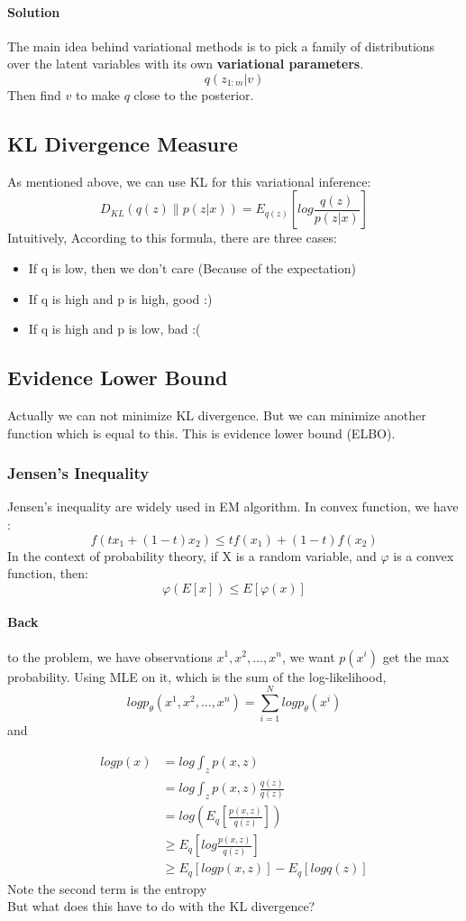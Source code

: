 \documentclass{article}
\begin{document}
\paragraph{Solution} The main idea behind variational methods is to pick a family of distributions over the latent variables with its own \textbf{variational parameters}.
$$q(z_{1:m}|v)$$
Then find $v$ to make $q$ close to the posterior.
\subsection{KL Divergence Measure}
As mentioned above, we can use KL for this variational inference:
$$D_{KL}(q(z) \parallel p(z|x))=E_{q(z)} \left[ log \frac{q(z)}{p(z|x)} \right]$$
Intuitively, According to this formula, there are three cases:
\begin{itemize}
\item If q is low, then we don't care (Because of the expectation)
\item If q is high and p is high, good :)
\item If q is high and p is low, bad :(
\end{itemize}
\subsection{Evidence Lower Bound}
Actually we can not minimize KL divergence. But we can minimize another function which is equal to this. This is evidence lower bound (ELBO).
\subsubsection{Jensen's Inequality}
Jensen's inequality are widely used in EM algorithm. In convex function, we have :
$$f(tx_{1}+(1-t)x_{2})\leq tf(x_{1})+(1-t)f(x_{2}) $$ 
In the context of probability theory, if X is a random variable, and $\varphi$ is a convex function, then:
$$\varphi(E[x]) \leq E[\varphi(x)]$$
\paragraph{Back} to the problem, we have observations $x^{1},x^{2},...,x^{n}$, we want $p(x^{i})$ get the max probability. Using MLE on it, which is the sum of the log-likelihood,
$$logp_{\theta}(x^{1},x^{2},...,x^{n})=\sum_{i=1}^{N}logp_{\theta} (x^{i})$$
and

\begin{align*}
logp(x) & =log \int_{z}p(x,z) \\
 &= log \int_{z}p(x,z)\frac{q(z)}{q(z)} \\
 &= log \left( E_{q} \left[ \frac{p(x,z)}{q(z)} \right] \right) \\
 &\geq E_{q} \left[ log \frac{p(x,z)}{q(z)} \right] \\
 &\geq E_{q}[logp(x,z)]-E_{q}[logq(z)]
\end{align*}
Note the second term is the entropy\\
But what does this have to do with the KL divergence? 
\end{document}
